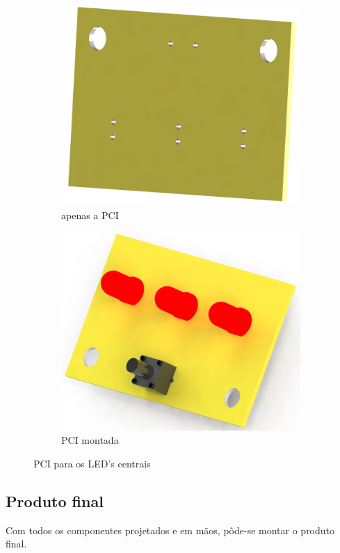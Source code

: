            \begin{figure}[H]
                \centering
                \begin{subfigure}{.5\textwidth}
                  \centering
                  \includegraphics[scale=0.2]{Imagens/SW_Images/placa_universal_para_os_leds.png}
                  \caption{apenas a PCI}
                  \label{fig:just_leds_pcb}
                \end{subfigure}%
                \begin{subfigure}{.5\textwidth}
                  \centering
                  \includegraphics[scale=0.2]{Imagens/SW_Images/placa_universal_para_os_leds_montada.png}
                  \caption{PCI montada}
                  \label{fig:pcb_leds_full}
                \end{subfigure}
                \caption{PCI para os LED's centrais}
                \label{fig:pcb_leds}
            \end{figure}
        
        \subsection{Produto final}
        
            Com todos os componentes projetados e em mãos, pôde-se montar o produto final.
            
            
        